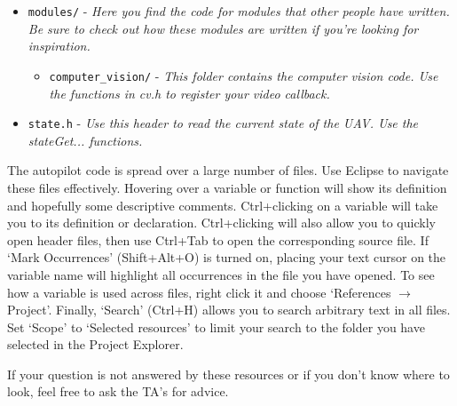 \documentclass{article}
\begin{document}
\begin{itemize}
\begin{itemize}
\item \texttt{modules/} - \emph{Here you find the code for modules that other people have written. Be sure to check out how these modules are written if you're looking for inspiration.}
\begin{itemize}
\item \texttt{computer\_vision/} - \emph{This folder contains the computer vision code. Use the functions in cv.h to register your video callback.}
\end{itemize}
\item \texttt{state.h} - \emph{Use this header to read the current state of the UAV. Use the stateGet... functions.}
\end{itemize}
\end{itemize}

The autopilot code is spread over a large number of files. Use Eclipse to navigate these files effectively. Hovering over a variable or function will show its definition and hopefully some descriptive comments. Ctrl+clicking on a variable will take you to its definition or declaration. Ctrl+clicking will also allow you to quickly open header files, then use Ctrl+Tab to open the corresponding source file.
If `Mark Occurrences' (Shift+Alt+O) is turned on, placing your text cursor on the variable name will highlight all occurrences in the file you have opened.
To see how a variable is used across files, right click it and choose `References $\rightarrow$ Project'.
Finally, `Search' (Ctrl+H) allows you to search arbitrary text in all files. Set `Scope' to `Selected resources' to limit your search to the folder you have selected in the Project Explorer.

If your question is not answered by these resources or if you don't know where to look, feel free to ask the TA's for advice.
\end{document}
